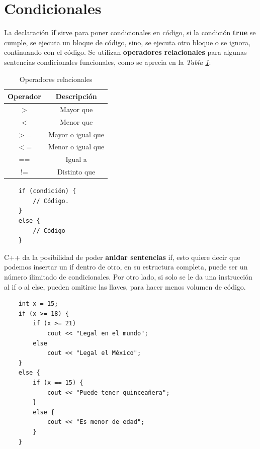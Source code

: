 \section{Condicionales}
\hspace{0.55cm}
La declaración \textbf{if} sirve para poner condicionales en código, si la condición \textbf{true} se cumple, se ejecuta un bloque de código, sino, se ejecuta otro bloque o se ignora, continuando con el código. Se utilizan \textbf{operadores relacionales} para algunas sentencias condicionales funcionales, como se aprecia en la \textit{Tabla \ref{tab: 5}}:
\begin{table}[H]
    \begin{center}
        \caption{Operadores relacionales}
        \label{tab: 5}
        \begin{tabular}{c c}
            \hline
            \textbf{Operador} & \textbf{Descripción} \\
            \hline
            $>$		& Mayor que \\
            $<$		& Menor que \\
            $>$=	& Mayor o igual que \\
            $<$=	& Menor o igual que \\
            ==		& Igual a \\
            !=		& Distinto que \\
            \hline
        \end{tabular}
    \end{center}
\end{table}
\begin{lstlisting}
    if (condición) {
        // Código.
    }
    else {
        // Código 
    }
\end{lstlisting}

C++ da la posibilidad de poder \textbf{anidar sentencias} if, esto quiere decir que podemos insertar un if dentro de otro, en su estructura completa, puede ser un número ilimitado de condicionales. Por otro lado, si solo se le da una instrucción al if o al else, pueden omitirse las llaves, para hacer menos volumen de código.
\begin{lstlisting}
    int x = 15;
    if (x >= 18) {
        if (x >= 21)
            cout << "Legal en el mundo";
        else
            cout << "Legal el México";
    }
    else {
        if (x == 15) {
            cout << "Puede tener quinceañera";
        }
        else {
            cout << "Es menor de edad";
        }
    }
\end{lstlisting}

